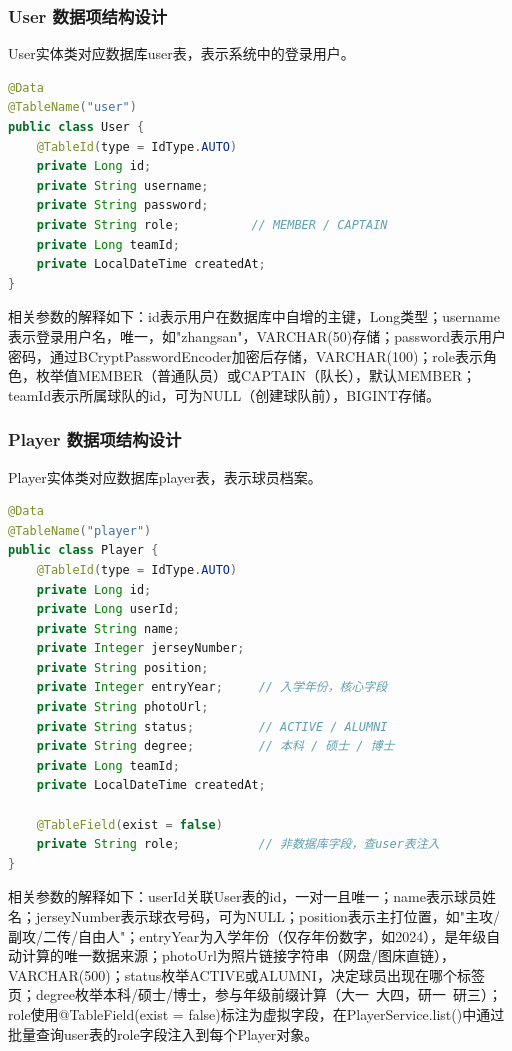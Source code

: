 \documentclass[12pt,a4paper]{ctexart}
\begin{document}
\subsubsection{User 数据项结构设计}

User实体类对应数据库user表，表示系统中的登录用户。

\begin{lstlisting}[language=Java, caption=User.java]
@Data
@TableName("user")
public class User {
    @TableId(type = IdType.AUTO)
    private Long id;
    private String username;
    private String password;
    private String role;          // MEMBER / CAPTAIN
    private Long teamId;
    private LocalDateTime createdAt;
}
\end{lstlisting}

相关参数的解释如下：id表示用户在数据库中自增的主键，Long类型；username表示登录用户名，唯一，如"zhangsan"，VARCHAR(50)存储；password表示用户密码，通过BCryptPasswordEncoder加密后存储，VARCHAR(100)；role表示角色，枚举值MEMBER（普通队员）或CAPTAIN（队长），默认MEMBER；teamId表示所属球队的id，可为NULL（创建球队前），BIGINT存储。

\subsubsection{Player 数据项结构设计}

Player实体类对应数据库player表，表示球员档案。

\begin{lstlisting}[language=Java, caption=Player.java]
@Data
@TableName("player")
public class Player {
    @TableId(type = IdType.AUTO)
    private Long id;
    private Long userId;
    private String name;
    private Integer jerseyNumber;
    private String position;
    private Integer entryYear;     // 入学年份，核心字段
    private String photoUrl;
    private String status;         // ACTIVE / ALUMNI
    private String degree;         // 本科 / 硕士 / 博士
    private Long teamId;
    private LocalDateTime createdAt;

    @TableField(exist = false)
    private String role;           // 非数据库字段，查user表注入
}
\end{lstlisting}

相关参数的解释如下：userId关联User表的id，一对一且唯一；name表示球员姓名；jerseyNumber表示球衣号码，可为NULL；position表示主打位置，如"主攻/副攻/二传/自由人"；entryYear为入学年份（仅存年份数字，如2024），是年级自动计算的唯一数据来源；photoUrl为照片链接字符串（网盘/图床直链），VARCHAR(500)；status枚举ACTIVE或ALUMNI，决定球员出现在哪个标签页；degree枚举本科/硕士/博士，参与年级前缀计算（大一~大四，研一~研三）；role使用@TableField(exist = false)标注为虚拟字段，在PlayerService.list()中通过批量查询user表的role字段注入到每个Player对象。
\end{document}

